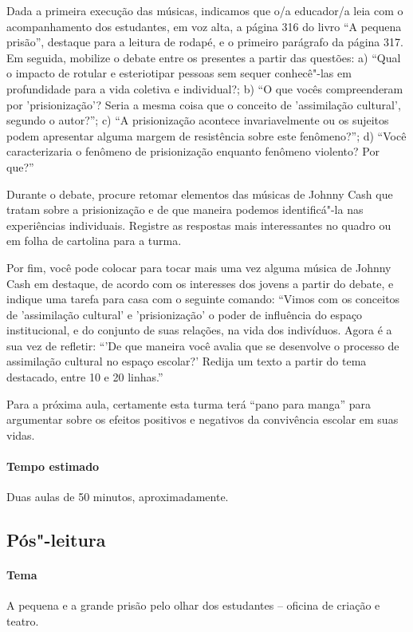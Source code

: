 \documentclass[11pt]{extarticle}
\begin{document}
Dada a primeira execução das músicas, indicamos que o/a educador/a leia
com o acompanhamento dos estudantes, em voz alta, a página 316 do livro
``A pequena prisão'', destaque para a leitura de rodapé, e o primeiro
parágrafo da página 317. Em seguida, mobilize o debate entre os
presentes a partir das questões: a) ``Qual o impacto de rotular e
esteriotipar pessoas sem sequer conhecê"-las em profundidade para a vida
coletiva e individual?; b) ``O que vocês compreenderam por
'prisionização'? Seria a mesma coisa que o conceito de 'assimilação
cultural', segundo o autor?''; c) ``A prisionização acontece invariavelmente ou
os sujeitos podem apresentar alguma margem de resistência sobre este
fenômeno?''; d) ``Você caracterizaria o fenômeno de prisionização enquanto
fenômeno violento? Por que?''

Durante o debate, procure retomar elementos das músicas de Johnny Cash
que tratam sobre a prisionização e de que maneira podemos identificá"-la
nas experiências individuais. Registre as respostas mais interessantes
no quadro ou em folha de cartolina para a turma.

Por fim, você pode colocar para tocar mais uma vez alguma música de
Johnny Cash em destaque, de acordo com os interesses dos jovens a partir
do debate, e indique uma tarefa para casa com o seguinte comando:
``Vimos com os conceitos de 'assimilação cultural' e 'prisionização' o
poder de influência do espaço institucional, e do conjunto de suas
relações, na vida dos indivíduos. Agora é a sua vez de refletir: ``'De que
maneira você avalia que se desenvolve o processo de assimilação cultural
no espaço escolar?' Redija um texto a partir do tema destacado, entre 10
e 20 linhas.''

Para a próxima aula, certamente esta turma terá ``pano para manga'' para
argumentar sobre os efeitos positivos e negativos da convivência escolar
em suas vidas.

\paragraph{Tempo estimado} Duas aulas de 50 minutos, aproximadamente.

\subsection{Pós"-leitura}

\paragraph{Tema} A pequena e a grande prisão pelo olhar dos estudantes
-- oficina de criação e teatro.
\end{document}
